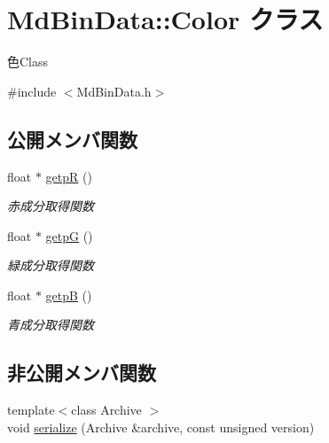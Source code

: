 \hypertarget{class_md_bin_data_1_1_color}{}\section{Md\+Bin\+Data\+:\+:Color クラス}
\label{class_md_bin_data_1_1_color}


色\+Class  




{\ttfamily \#include $<$Md\+Bin\+Data.\+h$>$}

\subsection*{公開メンバ関数}
\begin{DoxyCompactItemize}
\item 
float $\ast$ \mbox{\hyperlink{class_md_bin_data_1_1_color_aa4731175fd7438ff0e3d20db51fa87e2}{getpR}} ()
\begin{DoxyCompactList}\small\item\em 赤成分取得関数 \end{DoxyCompactList}\item 
float $\ast$ \mbox{\hyperlink{class_md_bin_data_1_1_color_a8d33bc92cef898d6026d8bd1f1fd51b0}{getpG}} ()
\begin{DoxyCompactList}\small\item\em 緑成分取得関数 \end{DoxyCompactList}\item 
float $\ast$ \mbox{\hyperlink{class_md_bin_data_1_1_color_adbd0c3f5aa7d8026e6d5638a4b42aeb6}{getpB}} ()
\begin{DoxyCompactList}\small\item\em 青成分取得関数 \end{DoxyCompactList}\end{DoxyCompactItemize}
\subsection*{非公開メンバ関数}
\begin{DoxyCompactItemize}
\item 
{\footnotesize template$<$class Archive $>$ }\\void \mbox{\hyperlink{class_md_bin_data_1_1_color_a7442aa5a639d3324010bb56f6db2a5fc}{serialize}} (Archive \&archive, const unsigned version)
\end{DoxyCompactItemize}
